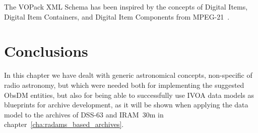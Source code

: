 			The VOPack XML Schema has been inspired by the concepts
			of Digital Items, Digital Item Containers, and Digital
			Item Components from MPEG-21~\cite{Bormans:fk}.
		
		
	
	\section{Conclusions} %
	\label{sec:radams_curation_etc_conclusions}
		
		In this chapter we have dealt with generic astronomical
		concepts, non-specific of radio astronomy, but which 
		were needed both for implementing the suggested ObsDM
		entities, but also for being able to successfully use IVOA
		data models as blueprints for archive development, as it
		will be shown when applying the data model to the archives
		of DSS-63 and IRAM~30m in
		chapter~\ref{cha:radams_based_archives}.
		
	
